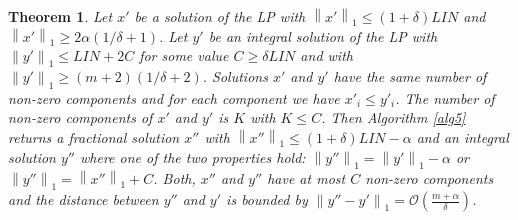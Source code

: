 \documentclass[a4paper,11pt]{article}
\newcommand{\nor}[1]{\left\|#1\right\|}
\newtheorem{thm}{Theorem}
\begin{document}
\begin{thm}\label{thm8}
	Let $x'$ be a solution of the LP with $\nor{x'}_1 \leq (1+\delta) \mathit{LIN}$ and $\nor{x'}_1 \geq 
	2 \alpha (1/ \delta +1)$. Let $y'$ be an integral
	 solution of the LP with $\nor{y'}_1 \leq \mathit{LIN} +2C$ for some value $C \geq \delta \mathit{LIN}$
	 and with $\nor{y'}_1 \geq (m+2)(1/\delta +2)$.
	 Solutions $x'$ and $y'$ have the same number of non-zero components and for each component we have 
	 $x'_i \leq y'_i$. The number of non-zero components of $x'$ and $y'$ is $K$ with $K \leq C$.
	Then Algorithm \ref{alg5} returns a fractional solution $x''$ with $\nor{x''}_1 \leq (1+ \delta) \mathit{LIN} -\alpha$
	 and an integral solution
	$y''$ where one of the two properties hold:
	 $\nor{y''}_1 = \nor{y'}_1 - \alpha$ or $\nor{y''}_1 = \nor{x''}_1 + C$. 
	 Both, $x''$ and $y''$ have at most $C$
	non-zero components and the distance between $y''$ and $y'$ is bounded by $\nor{y''-y'}_1 
	= \mathcal{O}(\frac{m + \alpha}{\delta})$.
\end{thm}
\end{document}

